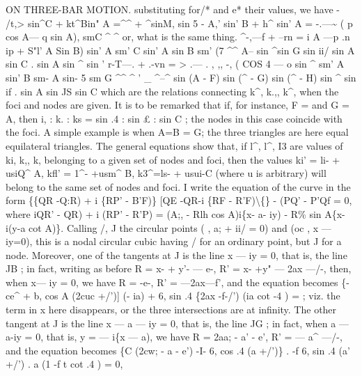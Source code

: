 \documentclass[11pt,a4paper]{book}
\begin{document}
ON THREE-BAR MOTION.
substituting for/* and
e* their values, we have
- /t,> sin\textasciicircum{}C + kt\textasciicircum{}Bin" A =\textasciicircum{}\textasciicircum{} + \textasciicircum{}sinM,
sin 5
- A,' sin' B + h\textasciicircum{} sin' A =
-.---\textasciitilde{} ( p cos A--- q sin A),
smC \textasciicircum{}
\textasciicircum{}
or, what
is the same thing.
\textasciicircum{}-,---f +
--rn =
i
A
\textbullet{}---p
\textbullet{} .n ip + S"l' A Sin B)
sin' A
sm' C
sin' A sin B sm' (7 \textasciicircum{}\textasciicircum{}
A-- sin \textasciicircum{}sin G sin ii/
sin A sin C
. sin A sin \textasciicircum{} sin
'
r-T---. +
.-vn =
>
.---
.
, ,,
-, (\guillemotright{} COS 4 --- o sin \textasciicircum{}
sm' A
sin' B
sm- A sin- 5 sm G \textasciicircum{}\textasciicircum{}
\textasciicircum{}
'
\_
\textasciicircum{}--\textasciicircum{} sin (A - F) sin (\textasciicircum{} - G) sin (\textasciicircum{} - H)
sin \textasciicircum{} sin if
. sin A sin JS sin C
which are the
relations connecting
k\textasciicircum{},
k.,,
k\textasciicircum{}, when the
foci and nodes are given.
It
is
to
be
remarked
that
if,
for
instance, F =
and
G = A,
then
i,
:
k.
:
ks
= sin .4
:
sin \pounds{}
:
sin C
; the nodes
in
this
case
coincide with the
foci.
A simple example
is when A=B = G; the three triangles are here equal
equilateral
triangles.
The general
equations show
that,
if
l\textasciicircum{},
l\textasciicircum{},
I3
are
values
of
ki,
k,,
k,
belonging
to
a
given
set
of
nodes and
foci, then the values
ki' = li- + usiQ\textasciicircum{} A,
kfl' = 1\textasciicircum{}- +usm\textasciicircum{} B, k3\textasciicircum{}=ls- + usui-C (where
u
is
arbitrary)
will belong to the same
set of nodes and
foci.
I
write the equation of the curve
in
the form
\{\{QR -Q:R) + i \{RP' - B'F)\} [QE -QR-i \{RF - R'F)\textbackslash\{\} - (PQ' - P'Qf = 0,
where
iQR' - QR) + i (RP' - R'P) = (A;, - Rlh cos A)i\{x- a- iy) - R\% sin A\{x-i(y-a cot A)\}.
Calling
/, J
the
circular
points (\guillemotleft{}
,
a; + ii/ = 0)
and
(oc
, x --- iy=0),
this
is
a
nodal
circular
cubic
having /
for
an
ordinary point,
but J
for a node.
Moreover, one
of the
tangents at J
is the
line x --- iy = 0,
that
is,
the
line JB
;
in
fact,
writing
as
before
R = x- + y'- --- e-,
R' = x- +y" --- 2ax ---/-,
then, when x--- iy = 0, we have R = -e-, R' = ---2ax---f', and the equation becomes
\{-ce\textasciicircum{} + b, cos A (2cuc +/')] (- ia) + 6, sin .4 \{2ax -f-/') (ia cot -4 ) =
;
viz.
the
term
in x
here
disappears,
or
the
three
intersections
are
at
infinity.
The
other
tangent
at J
is
the
line
x --- a --- iy = 0,
that
is,
the
line JG ;
in
fact,
when
a --- a-iy = 0,
that
is, y = --- i\{x --- a), we
have R = 2aa; - a' - e',
R' = --- a\textasciicircum{} ---/-,
and
the
equation becomes
\{C (2cw; - a\guillemotleft{} - e') -I- 6, cos .4 (a\guillemotright{} +/')\}
.
-f 6, sin .4 (a' +/') . a (1 -f t cot .4 ) = 0,
\end{document}
